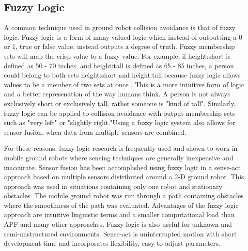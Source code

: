 \documentclass[10pt, conference, compsocconf]{IEEEtran}
\begin{document}
\subsection{Fuzzy Logic}
A common technique used in ground robot collision avoidance is that of fuzzy logic.  Fuzzy logic is a form of many valued logic which instead of outputting a 0 or 1, true or false value, instead outputs a degree of truth.  Fuzzy membership sets will map the crisp value to a fuzzy value.  For example, if height:short is defined as 50 - 70 inches, and height:tall is defined as  65 - 85 inches, a person could belong to both sets height:short and height:tall because fuzzy logic allows values to be a member of two sets at once \cite{fuzzyBook}. This is a more intuitive form of logic and a better represenation of the way humans think. A person is not always exclusively short or exclusively tall, rather someone is "kind of tall". Similarly, fuzzy logic can be applied to collision avoidance with output membership sets such as "very left" or "slightly right."Using a fuzzy logic system also allows for sensor fusion, when data from multiple sensors are combined. 

For these reasons, fuzzy logic research is frequently used and shown to work in mobile ground robots where sensing techniques are generally inexpensive and inaccurate. Sensor fusion has been accomplished using fuzzy logic in a sense-act approach based on multiple sensors distributed around a 2-D ground robot \cite{martinez1993fuzzy}.This approach was used in situations containing only one robot and stationary obstacles.  The mobile ground robot was run through a path containing obstacles where the smoothness of the path was evaluated. Advantages of the fuzzy logic approach are intuitive linguistic terms and a smaller computational load than APF and many other approaches. Fuzzy logic is also useful for unknown and semi-unstructured environments. Sense-act is uninterrupted motion with short development time and incorporates flexibility, easy to adjust parameters. 
\end{document}
